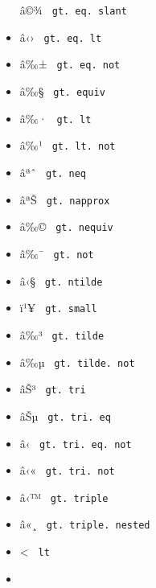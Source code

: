 \begin{itemize}
  \label{symbol-gt.eq.slant}{{ â©¾ }
  \texttt{\ gt.\ eq.\ slant\ }}
\item
  \label{symbol-gt.eq.lt}{{ â‹› }
  \texttt{\ gt.\ eq.\ lt\ }}
\item
  \label{symbol-gt.eq.not}{{ â‰± }
  \texttt{\ gt.\ eq.\ not\ }}
\item
  \label{symbol-gt.equiv}{{ â‰§ }
  \texttt{\ gt.\ equiv\ }}
\item
  \label{symbol-gt.lt}{{ â‰· } \texttt{\ gt.\ lt\ }}
\item
  \label{symbol-gt.lt.not}{{ â‰¹ }
  \texttt{\ gt.\ lt.\ not\ }}
\item
  \label{symbol-gt.neq}{{ âªˆ } \texttt{\ gt.\ neq\ }}
\item
  \label{symbol-gt.napprox}{{ âªŠ }
  \texttt{\ gt.\ napprox\ }}
\item
  \label{symbol-gt.nequiv}{{ â‰© }
  \texttt{\ gt.\ nequiv\ }}
\item
  \label{symbol-gt.not}{{ â‰¯ } \texttt{\ gt.\ not\ }}
\item
  \label{symbol-gt.ntilde}{{ â‹§ }
  \texttt{\ gt.\ ntilde\ }}
\item
  \label{symbol-gt.small}{{ ï¹¥ }
  \texttt{\ gt.\ small\ }}
\item
  \label{symbol-gt.tilde}{{ â‰³ }
  \texttt{\ gt.\ tilde\ }}
\item
  \label{symbol-gt.tilde.not}{{ â‰µ }
  \texttt{\ gt.\ tilde.\ not\ }}
\item
  \label{symbol-gt.tri}{{ âŠ³ } \texttt{\ gt.\ tri\ }}
\item
  \label{symbol-gt.tri.eq}{{ âŠµ }
  \texttt{\ gt.\ tri.\ eq\ }}
\item
  \label{symbol-gt.tri.eq.not}{{ â‹­ }
  \texttt{\ gt.\ tri.\ eq.\ not\ }}
\item
  \label{symbol-gt.tri.not}{{ â‹« }
  \texttt{\ gt.\ tri.\ not\ }}
\item
  \label{symbol-gt.triple}{{ â‹™ }
  \texttt{\ gt.\ triple\ }}
\item
  \label{symbol-gt.triple.nested}{{ â«¸ }
  \texttt{\ gt.\ triple.\ nested\ }}
\item
  \label{symbol-lt}{{ \textless{} } \texttt{\ lt\ }}
\item

\end{itemize}
